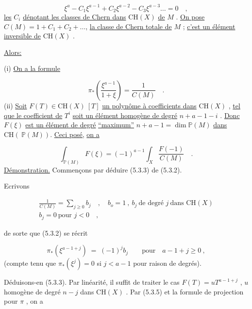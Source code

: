 \begin{equation}\tag{5.3.1}
\xi^a - C_1\xi^{a-1} + C_2\xi^{a-2} - C_3\xi^{a-3} \ldots = 0 \quad ,
\end{equation}
\underline{les} $C_i$ \underline{dénotant les classes de Chern dans} $\mathrm{CH}(X)$ \underline{de} $M$ . \underline{On pose} $C(M) = 1+C_1+C_2+\ldots$, \underline{la classe de Chern totale de} $M$ ; \underline{c'est un élément inversible de} $\mathrm{CH}(X)$ .

\underline{Alors:}

(i) \underline{On a la formule}

\begin{equation}\tag{5.3.2}
\pi_*\!\left(\frac{\xi^{a-1}}{1 + \xi}\right) = \frac{1}{C(M)} \quad .
\end{equation}
(ii) \underline{Soit} $F(T) \in \mathrm{CH}(X)\ [T]$ \underline{un polynôme à coefficients dans} $\mathrm{CH}(X)$ , \underline{tel que le coefficient de} $T^i$ \underline{soit un élément homogène de degré} $n+a-1-i$ . \underline{Donc} $F(\xi)$ \underline{est un élément de degré} \underline{``maximum''} $n+a-1=\dim \mathbb{P}(M)$ \underline{dans} $\mathrm{CH}(\ \mathbb{P}(M))$. \underline{Ceci posé,} \underline{on a}

\begin{equation}\tag{5.3.3}
\int_{\mathbb{P}(M)} F(\xi) = (-1)^{a-1} \int_X \frac{F(-1)}{C(M)} \quad .
\end{equation}
\underline{Démonstration.} Commençons par déduire (5.3.3) de (5.3.2).

Ecrivons

\begin{equation}\tag{5.3.4}
\begin{gathered} \frac{1}{C(M)} = \sum_{j \geq 0} b_j \quad , \quad b_o = 1 \ , \ b_j \ \text{de degré } j \ \text{dans } \mathrm{CH}(X) \\ b_j = 0 \ \text{pour } j < 0 \quad , \end{gathered}
\end{equation}

de sorte que (5.3.2) se récrit

\begin{equation}\tag{5.3.5}
\pi_*(\xi^{a-1+j}) \;=\; (-1)^j b_j \qquad \mbox{pour} \quad a-1+j \geq 0 \ ,
\end{equation}
(compte tenu que $\pi_*(\xi^j) = 0$ si $j < a-1$ pour raison de degrés).

Déduisons-en (5.3.3). Par linéarité, il suffit de traiter le cas $F(T) = uT^{a-1+j}$ , $u$ homogène de degré $n-j$ dans $\mathrm{CH}(X)$ . Par (5.3.5) et la formule de projection pour $\pi$ , on a

